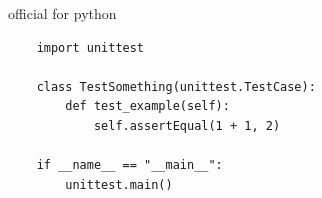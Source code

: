 official for python

\begin{verbatim}
    import unittest

    class TestSomething(unittest.TestCase):
        def test_example(self):
            self.assertEqual(1 + 1, 2)
    
    if __name__ == "__main__":
        unittest.main()

\end{verbatim}